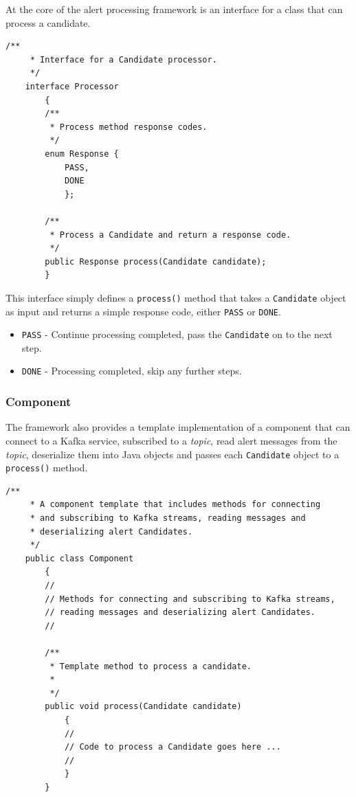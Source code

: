 \documentclass{article}
\newcommand{\kftopic} {\textit{topic}\xspace}
\newcommand{\deserz}    {deserialize\xspace}
\begin{document}
At the core of the alert processing framework is an interface for a class that can process a candidate.

\begin{lstlisting}[style=Java]
    /**
     * Interface for a Candidate processor.
     */
    interface Processor
        {
        /**
         * Process method response codes.
         */
        enum Response {
            PASS,
            DONE
            };

        /**
         * Process a Candidate and return a response code.
         */
        public Response process(Candidate candidate);
        }
\end{lstlisting}

This interface simply defines a \texttt{process()} method that takes a \texttt{Candidate} object as input and
returns a simple response code, either \texttt{PASS} or \texttt{DONE}.

\begin{itemize}
  \item \texttt{PASS} - Continue processing completed, pass the \texttt{Candidate} on to the next step.
  \item \texttt{DONE} - Processing completed, skip any further steps.
\end{itemize}

\subsubsection{Component}
\label{java-interfaces.Component}

The framework also provides a template implementation of a component that can connect to a Kafka service, subscribed to a \kftopic, read alert messages from the \kftopic, \deserz them into Java objects and passes each \texttt{Candidate} object to a \texttt{process()} method.

\begin{lstlisting}[style=Java]
    /**
     * A component template that includes methods for connecting
     * and subscribing to Kafka streams, reading messages and
     * deserializing alert Candidates.
     */
    public class Component
        {
        //
        // Methods for connecting and subscribing to Kafka streams,
        // reading messages and deserializing alert Candidates.
        //

        /**
         * Template method to process a candidate.
         *
         */
        public void process(Candidate candidate)
            {
            //
            // Code to process a Candidate goes here ...
            //
            }
        }
\end{lstlisting}
\end{document}
